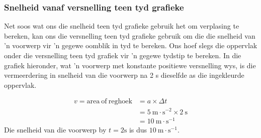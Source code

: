 \subsubsection*{Snelheid vanaf versnelling teen tyd grafieke}
            \nopagebreak
Net soos wat ons die snelheid teen tyd grafieke gebruik het om verplasing te bereken, kan ons die versnelling teen tyd grafieke gebruik om die die snelheid van  'n voorwerp vir  'n gegewe oomblik in tyd te bereken. Ons hoef slegs die oppervlak onder die versnelling teen tyd grafiek vir  'n gegewe tydstip te bereken. In die grafiek hieronder, wat  'n voorwerp met konstante positiewe versnelling wys, is die vermeerdering in snelheid van die voorwerp na 2 s dieselfde as die ingekleurde oppervlak. \par
          \label{m38795*id72760}\nopagebreak\noindent{}
            
    \begin{align*}
    v=\text{area}~\text{of}~\text{reghoek}&= a\ensuremath{\times}\Delta t\\ 
      &= 5~\text{m}\ensuremath{\cdot}{\text{s}}^{-2}\ensuremath{\times}2~\text{s}\\ 
      &= 10~\text{m}\ensuremath{\cdot}{\text{s}}^{-1}
      \end{align*}
Die snelheid van die voorwerp by $t=2\text{s}$ is dus $10~\text{m}\ensuremath{\cdot}\text{s}{}^{-1}$. %
    \label{m38795*cid8}


